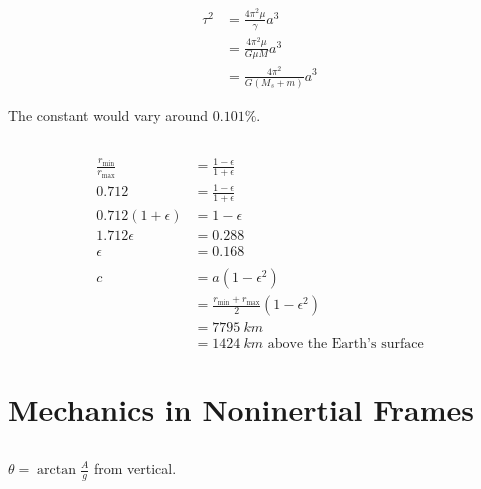 \documentclass{article}
\begin{document}
\begin{align*}
  \tau^2 & = \frac{4 \pi^2 \mu}{\gamma} a^3  \\
         & = \frac{4 \pi^2 \mu}{G \mu M} a^3 \\
         & = \frac{4 \pi^2}{G (M_s + m)} a^3
\end{align*}

The constant would vary around $0.101\%$.

\setcounter{subsection}{18}
\subsection{}

\begin{align*}
  \frac{r_\text{min}}{r_\text{max}} & = \frac{1 - \epsilon}{1 + \epsilon}                      \\
  0.712                             & = \frac{1 - \epsilon}{1 + \epsilon}                      \\
  0.712 (1 + \epsilon)              & = 1 - \epsilon                                           \\
  1.712 \epsilon                    & = 0.288                                                  \\
  \epsilon                          & = 0.168                                                  \\ \\
  c                                 & = a (1 - \epsilon^2)                                     \\
                                    & = \frac{r_\text{min} + r_\text{max}}{2} (1 - \epsilon^2) \\
                                    & = \qty{7795}{km}                                         \\
                                    & = \qty{1424}{km} \text{ above the Earth's surface}
\end{align*}

\section{Mechanics in Noninertial Frames}

\subsection{}

$\theta = \arctan \frac{A}{g}$ from vertical.
\end{document}
